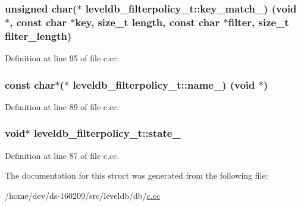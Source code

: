 \subsubsection[{key\+\_\+match\+\_\+}]{\setlength{\rightskip}{0pt plus 5cm}unsigned char($\ast$ leveldb\+\_\+filterpolicy\+\_\+t\+::key\+\_\+match\+\_\+) (void $\ast$, const char $\ast$key, size\+\_\+t length, const char $\ast$filter, size\+\_\+t filter\+\_\+length)}\label{structleveldb__filterpolicy__t_a453f04cb3420879256c6194b5de0a818}


Definition at line 95 of file c.\+cc.

\hypertarget{structleveldb__filterpolicy__t_a5fbc18ad0916314ffafe205543bad720}{}
\subsubsection[{name\+\_\+}]{\setlength{\rightskip}{0pt plus 5cm}const char$\ast$($\ast$ leveldb\+\_\+filterpolicy\+\_\+t\+::name\+\_\+) (void $\ast$)}\label{structleveldb__filterpolicy__t_a5fbc18ad0916314ffafe205543bad720}


Definition at line 89 of file c.\+cc.

\hypertarget{structleveldb__filterpolicy__t_a35aa5dd2f350f6eafa4ae904e55dcbe2}{}
\subsubsection[{state\+\_\+}]{\setlength{\rightskip}{0pt plus 5cm}void$\ast$ leveldb\+\_\+filterpolicy\+\_\+t\+::state\+\_\+}\label{structleveldb__filterpolicy__t_a35aa5dd2f350f6eafa4ae904e55dcbe2}


Definition at line 87 of file c.\+cc.



The documentation for this struct was generated from the following file\+:\begin{DoxyCompactItemize}
\item 
/home/dev/ds-\/160209/src/leveldb/db/\hyperlink{c_8cc}{c.\+cc}\end{DoxyCompactItemize}
